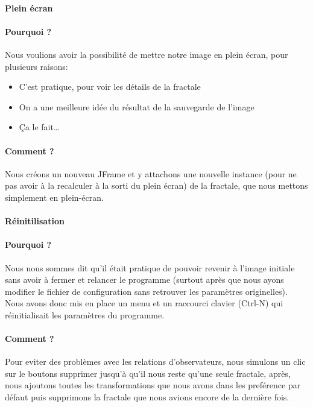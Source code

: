 \documentclass[a4paper]{article}
\begin{document}
\paragraph*{Plein écran}
\paragraph{Pourquoi ?}
Nous voulions avoir la possibilité de mettre notre image en plein écran, pour plusieurs raisons:
\begin{itemize}
\item C'est pratique, pour voir les détails de la fractale
\item On a une meilleure idée du résultat de la sauvegarde de l'image
\item Ça le fait\ldots
\end{itemize}

\paragraph{Comment ?}
Nous créons un nouveau JFrame et y attachons une nouvelle instance (pour ne pas avoir à la recalculer à la sorti du plein écran) de la fractale, que nous mettons simplement en plein-écran.

\paragraph*{Réinitilisation}
\paragraph{Pourquoi ?}
Nous nous sommes dit qu'il était pratique de pouvoir revenir à l'image initiale sans avoir à fermer et relancer le programme (surtout après que nous ayons modifier le fichier de configuration sans retrouver les paramètres originelles). Nous avons donc mis en place un menu et un raccourci clavier (Ctrl-N) qui réinitialisait les paramètres du programme.

\paragraph{Comment ?}
Pour eviter des problèmes avec les relations d'observateurs, nous simulons un clic sur le boutons supprimer jusqu'à qu'il nous reste qu'une seule fractale, après, nous ajoutons toutes les transformations que nous avons dans les preférence par défaut puis supprimons la fractale que nous avions encore de la dernière fois.
\end{document}
